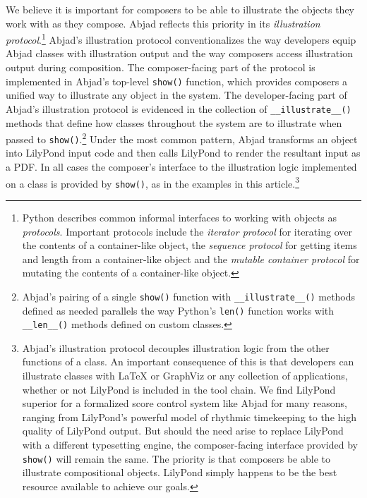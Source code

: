 \documentclass{article}
\begin{document}
We believe it is important for composers to be able to illustrate the objects
they work with as they compose. Abjad reflects this priority in its
\emph{illustration protocol}.\footnote{Python describes common informal
interfaces to working with objects as \emph{protocols}. Important protocols
include the \emph{iterator protocol} for iterating over the contents of a
container-like object, the \emph{sequence protocol} for getting items and
length from a container-like object and the \emph{mutable container protocol}
for mutating the contents of a container-like object.} Abjad's illustration
protocol conventionalizes the way developers equip Abjad classes with
illustration output and the way composers access illustration output during
composition. The composer-facing part of the protocol is implemented in Abjad's
top-level \texttt{show()} function, which provides composers a unified way to
illustrate any object in the system. The developer-facing part of Abjad's
illustration protocol is evidenced in the collection of
\texttt{\_\_illustrate\_\_()} methods that define how classes throughout the
system are to illustrate when passed to \texttt{show()}.\footnote{Abjad's
pairing of a single \texttt{show()} function with \texttt{\_\_illustrate\_\_()}
methods defined as needed parallels the way Python's \texttt{len()} function
works with \texttt{\_\_len\_\_()} methods defined on custom classes.} Under the
most common pattern, Abjad transforms an object into LilyPond input code and
then calls LilyPond to render the resultant input as a PDF. In all cases the
composer's interface to the illustration logic implemented on a  class is
provided by \texttt{show()}, as in the examples in this
article.\footnote{Abjad's illustration protocol decouples illustration logic
from the other functions of a class. An important consequence of this is that
developers can illustrate classes with LaTeX or GraphViz or any collection of
applications, whether or not LilyPond is included in the tool chain. We find
LilyPond superior for a formalized score control system like Abjad for many
reasons, ranging from LilyPond's powerful model of rhythmic timekeeping to the
high quality of LilyPond output. But should the need arise to replace LilyPond
with a different typesetting engine, the composer-facing  interface provided by
\texttt{show()} will remain the same. The priority is that composers be able to
illustrate compositional objects. LilyPond simply happens to be the best
resource available to achieve our goals.}

\end{document}
